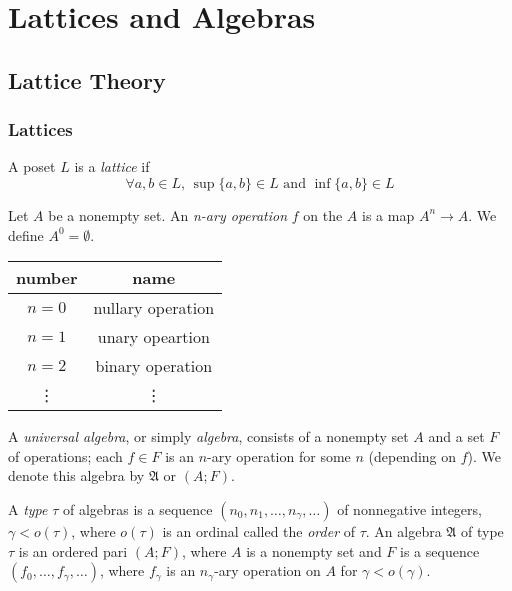 \part{Lattices and Algebras}

\chapter{Lattice Theory}

\section{Lattices}

\begin{definition}
    A poset \(L\) is a \emph{lattice} if
    \[\forall a,b \in L,\, \sup\{a,b\} \in L \mbox{ and } \inf\{a,b\} \in L\]
\end{definition}

\begin{definition}
    Let \(A\) be a nonempty set. An \emph{n-ary operation} \(f\) on the \(A\) is a map \(A^n \to A\). We define \(A^0=\emptyset\).
    \begin{center}
        \begin{tabular}{|c|c|}
            \hline
            number & name \\
            \hline
            \(n=0\) & nullary operation \\
            \(n=1\) & unary opeartion \\
            \(n=2\) & binary operation \\
            \vdots & \vdots \\
            \hline
        \end{tabular}
    \end{center}
\end{definition}

\begin{definition}
    A \emph{universal algebra}, or simply \emph{algebra}, consists of a nonempty set \(A\) and a set \(F\) of operations; each \(f \in F\) is an \(n\)-ary operation for some \(n\) (depending on \(f\)). We denote this algebra by \(\mathfrak{A}\) or \((A;F)\).
\end{definition}

A \emph{type} \(\tau\) of algebras is a sequence \((n_0,n_1,\dots,n_\gamma,\dots)\) of nonnegative integers, \(\gamma<o(\tau)\), where \(o(\tau)\) is an ordinal called the \emph{order} of \(\tau\). An algebra \(\mathfrak{A} \) of type \(\tau\) is an ordered pari \((A;F)\), where \(A\) is a nonempty set and \(F\) is a sequence \((f_0,\dots,f_\gamma,\dots)\), where \(f_\gamma\) is an \(n_\gamma\)-ary operation on \(A\) for \(\gamma < o(\gamma)\).

